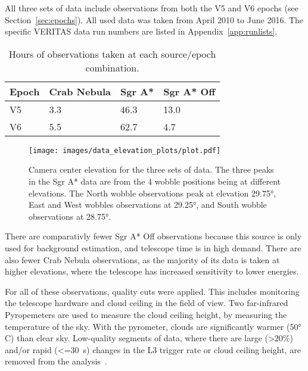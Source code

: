   All three sets of data include observations from both the V5 and V6 epochs (see Section~\ref{sec:epochs}).
  All used data was taken from April 2010 to June 2016.
  The specific VERITAS data run numbers are listed in Appendix~\ref{app:runlists}.

  \begin{table}[!ht]
    \centering
    \caption{Hours of observations taken at each source/epoch combination.}
    \label{tab:observation_times}
    \begin{tabular}{|l|l|l|l|}
      \hline
      \textbf{Epoch} & \textbf{Crab Nebula} & \textbf{Sgr A*} & \textbf{Sgr A* Off} \\ \hline
      V5             & 3.3                  & 46.3            & 13.0                \\ \hline
      V6             & 5.5                  & 62.7            & 4.7                 \\ \hline
    \end{tabular}
  \end{table}


  \begin{figure}[!ht]
    \centering
    \texttt{[image: images/data\_elevation\_plots/plot.pdf]}
    \caption[VERITAS Data Elevation Exposure]{
      Camera center elevation for the three sets of data.
      The three peaks in the Sgr A* data are from the 4 wobble positions being at different elevations.
      The North wobble observations peak at elevation \nicetilde\ang{29.75}, East and West wobbles observations at \nicetilde\ang{29.25}, and South wobble observations at \nicetilde\ang{28.75}.
    }
    \label{fig:datapointingelevations}
  \end{figure}

  There are comparativly fewer Sgr A* Off observations because this source is only used for background estimation, and telescope time is in high demand.
  There are also fewer Crab Nebula observations, as the majority of its data is taken at higher elevations, where the telescope has increased sensitivity to lower energies.
  
  For all of these observations, quality cuts were applied.
  This includes monitoring the telescope hardware and cloud ceiling in the field of view.
  Two far-infrared Pyropemeters are used to measure the cloud ceiling height, by measuring the temperature of the sky.
  With the pyrometer, clouds are significantly warmer (\nicetilde\ang{50} C) than clear sky.
  Low-quality segments of data, where there are large (>20\%) and/or rapid (<=\SI{30}{s}) changes in the L3 trigger rate or cloud ceiling height, are removed from the analysis~\cite{bird_weather}.

